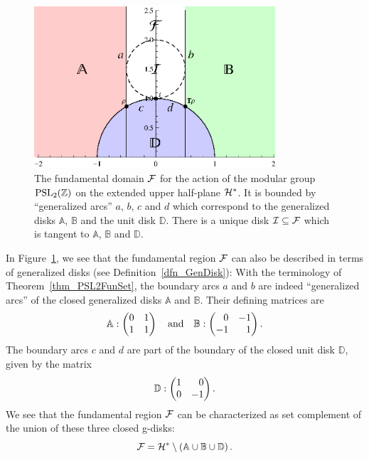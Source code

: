 \begin{remark}
\label{rem_PSL2FunDomGenDisks}
\begin{figure}
\centering
\includegraphics[width=0.8\textwidth]{figures/fundom}
\caption[The fundamental domain $\FunDom$ for the action of $\PSL{\Z}$ on $\EU$]{The fundamental domain $\FunDom$ for the action of the modular group $\PSL{\Z}$ on the extended upper half-plane $\EU$. It is bounded by ``generalized arcs'' $a$, $b$, $c$ and $d$ which correspond to the generalized disks $\mathbb{A}$, $\mathbb{B}$ and the unit disk $\mathbb{D}$. There is a unique disk $\mathcal{I} \subseteq \mathcal{F}$ which is tangent to $\mathbb{A}$, $\mathbb{B}$ and $\mathbb{D}$.}
\label{fig_PSL2FunDom}
\end{figure}
In Figure~\ref{fig_PSL2FunDom}, we see that the fundamental region $\FunDom$ can also be described in terms of generalized disks (see Definition~\ref{dfn_GenDisk}): With the terminology of Theorem~\ref{thm_PSL2FunSet}, the boundary arcs $a$ and $b$ are indeed ``generalized arcs'' of the closed generalized disks $\mathbb{A}$ and $\mathbb{B}$. Their defining matrices are
\begin{equation*}
\mathbb{A} : \begin{pmatrix}0 & 1 \\ 1 & 1\end{pmatrix} \quad \text{and} \quad 
\mathbb{B} : \begin{pmatrix}\phantom{+}0 & -1 \\ -1 & \phantom{+}1\end{pmatrix}.
\end{equation*}
The boundary arcs $c$ and $d$ are part of the boundary of the closed unit disk $\mathbb{D}$, given by the matrix
\begin{equation*}
\mathbb{D} : \begin{pmatrix}1 & \phantom{+}0 \\ 0 & -1\end{pmatrix}.
\end{equation*}
We see that the fundamental region $\FunDom$ can be characterized as set complement of the union of these three closed g-disks:
\begin{equation}
\label{eqn_PSL2FunDomDiskComplement}
\mathcal{F} = \mathcal{H}^\ast \setminus \left(\mathbb{A} \cup \mathbb{B} \cup \mathbb{D}\right).
\end{equation}
\end{remark}

